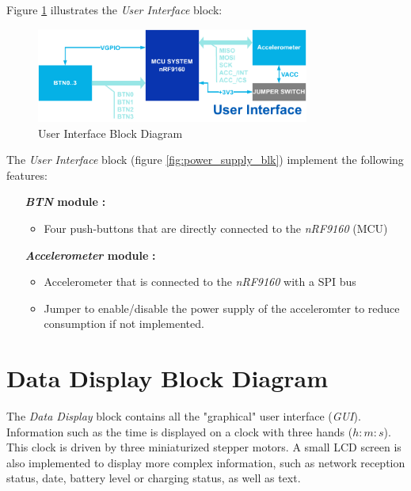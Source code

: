 \documentclass[report.tex]{subfiles}
\begin{document}
Figure \ref{fig:user_interface_blk} illustrates the \textit{User Interface} block:

\begin{figure}[H]
	\centering
	\includegraphics[width=0.8\textwidth]{Include/Figure/Hardware/user_interface_blk.pdf}
	\caption{User Interface Block Diagram}
	\label{fig:user_interface_blk}
\end{figure}

\begin{flushleft}
The \textit{User Interface} block (figure \ref{fig:power_supply_blk}) implement the following features:
\end{flushleft}
\begin{itemize}
\item [\quad\textbf{\textit{BTN} module}]\textbf{:}
\begin{itemize}
\item Four push-buttons that are directly connected to the \textit{nRF9160} (MCU)
\end{itemize}
\item [\quad\textbf{\textit{Accelerometer} module}]\textbf{:}
\begin{itemize}
\item Accelerometer that is connected to the \textit{nRF9160} with a SPI bus
\item Jumper to enable/disable the power supply of the acceleromter to reduce consumption if not implemented.
\end{itemize}
\end{itemize}

\section{Data Display Block Diagram} \label{sec:disp_blk_dgr}
The \textit{Data Display} block contains all the "graphical" user interface (\textit{GUI}). Information such as the time is displayed on a clock with three hands ($h:m:s$). This clock is driven by three miniaturized stepper motors. A small LCD screen is also implemented to display more complex information, such as network reception status, date, battery level or charging status, as well as text.\\
\end{document}
